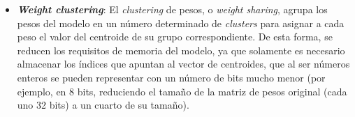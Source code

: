\documentclass[a4paper]{article}
\newcommand{\textbfit}[1]{\textbf{\textit{#1}}}
\begin{document}
\begin{itemize}
\begin{itemize}
    \end{itemize}
    \item \textbfit{Weight clustering}: El \textit{clustering} de pesos, o \textit{weight sharing}, agrupa los pesos del modelo en un número determinado de \textit{clusters} para asignar a cada peso el valor del centroide de su grupo correspondiente. De esta forma, se reducen los requisitos de memoria del modelo, ya que solamente es necesario almacenar los índices que apuntan al vector de centroides, que al ser números enteros se pueden representar con un número de bits mucho menor (por ejemplo, en 8 bits, reduciendo el tamaño de la matriz de pesos original (cada uno 32 bits) a un cuarto de su tamaño).
    

\end{itemize}
\end{document}
